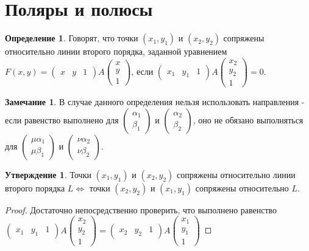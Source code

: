 \documentclass[a4paper, 12pt]{article}
\theoremstyle{definition}
\newtheorem*{definition}{Определение}
\newtheorem*{subtheorem}{Утверждение}
\newtheorem*{remark}{Замечание}
\begin{document}
	\section{Поляры и полюсы}
	\begin{definition}
		Говорят, что точки $(x_1, y_1)$ и $(x_2, y_2)$ сопряжены относительно линии второго порядка, заданной уравнением $F(x, y) = \begin{pmatrix} x&y&1 \end{pmatrix}A \begin{pmatrix} x  \\ y \\ 1 \end{pmatrix}$, если $\begin{pmatrix} x_1&y_1&1 \end{pmatrix}A \begin{pmatrix} x_2  \\ y_2 \\ 1 \end{pmatrix} = 0$.
	\end{definition}
	\begin{remark}
		В случае данного определения нельзя использовать направления - если равенство выполнено для $\begin{pmatrix} \alpha_1 \\ \beta_1 \end{pmatrix}$ и $\begin{pmatrix} \alpha_2 \\ \beta_2 \end{pmatrix}$, оно не обязано выполняться для $\begin{pmatrix} \mu\alpha_1 \\ \mu\beta_1 \end{pmatrix}$ и $\begin{pmatrix} \nu\alpha_2 \\ \nu\beta_2 \end{pmatrix}$.
	\end{remark}
	\begin{subtheorem}
		Точки $(x_1, y_1)$ и $(x_2, y_2)$ сопряжены относительно линии второго порядка $L \Leftrightarrow$ точки $(x_2, y_2)$ и $(x_1, y_1)$ сопряжены относительно $L$.
	\end{subtheorem}
	\begin{proof}
		Достаточно непосредственно проверить, что выполнено равенство $\begin{pmatrix} x_1&y_1&1 \end{pmatrix}A \begin{pmatrix} x_2  \\ y_2 \\ 1 \end{pmatrix} = \begin{pmatrix} x_2&y_2&1 \end{pmatrix}A \begin{pmatrix} x_1  \\ y_1 \\ 1 \end{pmatrix}$
	\end{proof}
\end{document}
